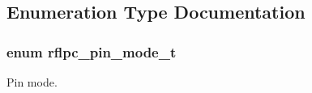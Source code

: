 \subsection{Enumeration Type Documentation}
\hypertarget{group__pinconf_gaf01a7075a0fa0280ce8cda6074e10ad7}{
\subsubsection[{rflpc\-\_\-pin\-\_\-mode\-\_\-t}]{\setlength{\rightskip}{0pt plus 5cm}enum {\bf rflpc\-\_\-pin\-\_\-mode\-\_\-t}}}\label{group__pinconf_gaf01a7075a0fa0280ce8cda6074e10ad7}


Pin mode. 

